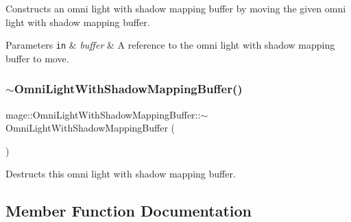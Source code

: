 Constructs an omni light with shadow mapping buffer by moving the given omni light with shadow mapping buffer.


\begin{DoxyParams}[1]{Parameters}
\mbox{\tt in}  & {\em buffer} & A reference to the omni light with shadow mapping buffer to move. \\
\hline
\end{DoxyParams}
\hypertarget{structmage_1_1_omni_light_with_shadow_mapping_buffer_ac28ea25ecb8f27be2403c37a16fd9631}{}\label{structmage_1_1_omni_light_with_shadow_mapping_buffer_ac28ea25ecb8f27be2403c37a16fd9631} 
\subsubsection{\texorpdfstring{$\sim$\+Omni\+Light\+With\+Shadow\+Mapping\+Buffer()}{~OmniLightWithShadowMappingBuffer()}}
{\footnotesize\ttfamily mage\+::\+Omni\+Light\+With\+Shadow\+Mapping\+Buffer\+::$\sim$\+Omni\+Light\+With\+Shadow\+Mapping\+Buffer (\begin{DoxyParamCaption}{ }\end{DoxyParamCaption})\hspace{0.3cm}{\ttfamily [default]}}

Destructs this omni light with shadow mapping buffer. 

\subsection{Member Function Documentation}
\hypertarget{structmage_1_1_omni_light_with_shadow_mapping_buffer_ab94e93f02ca982d85be2bd8da2714c01}{}\label{structmage_1_1_omni_light_with_shadow_mapping_buffer_ab94e93f02ca982d85be2bd8da2714c01} 
